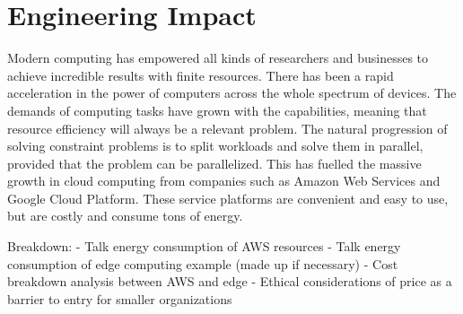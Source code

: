 \documentclass[../mthe-493-final-project.tex]{subfiles}
\begin{document}
    \chapter{Engineering Impact}
    \label{ch:engineering-impact}

    Modern computing has empowered all kinds of researchers and businesses to achieve incredible results with finite resources. There has been a rapid acceleration in the power of computers across the whole spectrum of devices. The demands of computing tasks have grown with the capabilities, meaning that resource efficiency will always be a relevant problem. The natural progression of solving constraint problems is to split workloads and solve them in parallel, provided that the problem can be parallelized. This has fuelled the massive growth in cloud computing from companies such as Amazon Web Services and Google Cloud Platform. These service platforms are convenient and easy to use, but are costly and consume tons of energy.


    Breakdown:
    - Talk energy consumption of AWS resources
    - Talk energy consumption of edge computing example (made up if necessary)
    - Cost breakdown analysis between AWS and edge
    - Ethical considerations of price as a barrier to entry for smaller organizations
\end{document}
